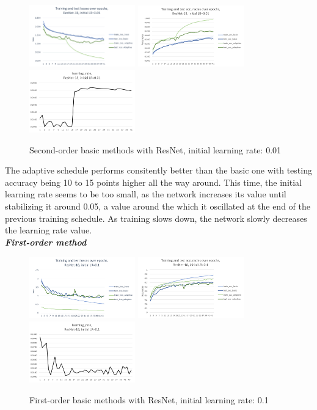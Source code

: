\documentclass{article}
\begin{document}
  \begin{figure}[!h]
	\includegraphics[width=130pt]{loss_resnet_0_01.png}
	\includegraphics[width=130pt]{acc_resnet_0_01.png}
	\includegraphics[width=130pt]{lr_resnet_0_01.png}
	\caption{Second-order basic methods with ResNet, initial learning rate: 0.01}
  \end{figure}
  
  The adaptive schedule performs consitently better than the basic one with testing accuracy being 10 to 15 points higher all the way around. This time, the initial learning rate seems to be too small, as the network increases its value until stabilizing it around 0.05, a value around the which it oscillated at the end of the previous training schedule. As training slows down, the network slowly decreases the learning rate value.\\
  
  \emph{\textbf{First-order method}}
  
  \begin{figure}[!h]
	\includegraphics[width=130pt]{loss_resnet_fo_0_1.png}
	\includegraphics[width=130pt]{acc_resnet_fo_0_1.png}
	\includegraphics[width=130pt]{lr_resnet_fo_0_1.png}
	\caption{First-order basic methods with ResNet, initial learning rate: 0.1}
  \end{figure}
\end{document}
